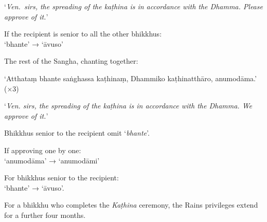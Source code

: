 ‘\emph{Ven.\ sirs, the spreading of the kaṭhina is in accordance with the Dhamma.
  Please approve of it.}’

If the recipient is senior to all the other bhikkhus:\\
‘bhante’ → ‘āvuso’

The rest of the Sangha, chanting together:

‘Atthataṃ bhante saṅghassa kaṭhinaṃ, Dhammiko kaṭhinatthāro, anumodāma.’ (×3)

‘\emph{Ven. sirs, the spreading of the kaṭhina is in accordance with the Dhamma.
  We approve of it.}’


Bhikkhus senior to the recipient omit ‘\emph{bhante}’.

If approving one by one:\\
‘anumodāma’ → ‘anumodāmi’

For bhikkhus senior to the recipient:\\
‘bhante’ → ‘āvuso’.

For a bhikkhu who completes the \emph{Kaṭhina} ceremony, the Rains privileges
extend for a further four months.


